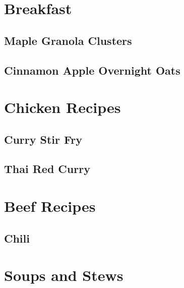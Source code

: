 \documentclass{report}
\begin{document}
\tableofcontents


\chapter{Breakfast}

%

\section{Maple Granola Clusters}


\newpage
\section{Cinnamon Apple Overnight Oats}


\chapter{Chicken Recipes}
\newpage
\section{Curry Stir Fry}

\newpage
\section{Thai Red Curry}

 
\chapter{Beef Recipes}
\newpage
\section{Chili}

\newpage



\chapter{Soups and Stews}
\newpage 
\end{document}
